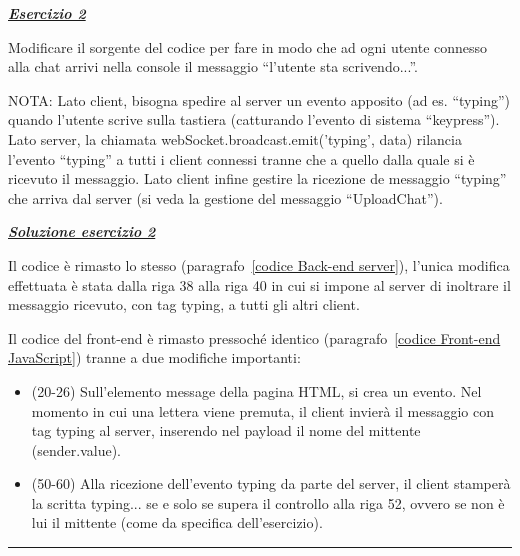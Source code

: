 \documentclass[a4paper]{article}
\newcommand{\longline}{\noindent\rule{\textwidth}{0.4pt}}
\newcommand{\dquotes}[1]{``#1''}
\begin{document}
	\noindent	
	\textcolor{Red3}{\textbf{\emph{\underline{Esercizio 2}}}}\newline
	
	\noindent
	Modificare il sorgente del codice per fare in modo che ad ogni utente connesso alla chat arrivi nella console il messaggio \dquotes{l'utente sta scrivendo...}.\newline
	
	\noindent
	NOTA: Lato client, bisogna spedire al server un evento apposito (ad es. \dquotes{typing}) quando l'utente scrive sulla tastiera (catturando l'evento di sistema \dquotes{keypress}). Lato server, la chiamata \textsf{webSocket.broadcast.emit('typing', data)} rilancia l'evento \dquotes{typing} a tutti i client connessi tranne che a quello dalla quale si è ricevuto il messaggio. Lato client infine gestire la ricezione de messaggio \dquotes{typing} che arriva dal server (si veda la gestione del messaggio \dquotes{UploadChat}).\newline
	
	\noindent	
	\textcolor{Green4}{\textbf{\emph{\underline{Soluzione esercizio 2}}}}\newline
	
	\noindent
	
	Il codice è rimasto lo stesso (paragrafo~\ref{codice Back-end server}), l'unica modifica effettuata è stata dalla riga 38 alla riga 40 in cui si impone al server di inoltrare il messaggio ricevuto, con tag \textsf{typing}, a tutti gli altri client.\newpage
	
	\noindent
	
	Il codice del front-end è rimasto pressoché identico (paragrafo~\ref{codice Front-end JavaScript}) tranne a due modifiche importanti:
	\begin{itemize}
		\item (20-26) Sull'elemento \textsf{message} della pagina HTML, si crea un evento. Nel momento in cui una lettera viene premuta, il client invierà il messaggio con tag \textsf{typing} al server, inserendo nel payload il nome del mittente (\textsf{sender.value}).
		
		\item (50-60) Alla ricezione dell'evento \textsf{typing} da parte del server, il client stamperà la scritta \textsf{typing...} se e solo se supera il controllo alla riga 52, ovvero se non è lui il mittente (come da specifica dell'esercizio).
	\end{itemize}
	
	\longline\newline
	
\end{document}
